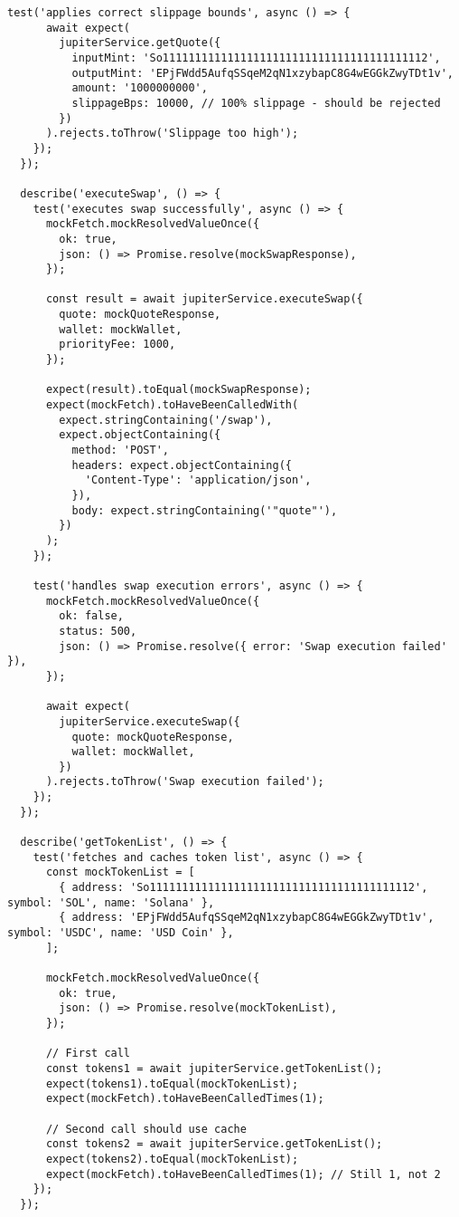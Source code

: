 \documentclass[11pt,a4paper]{article}
\begin{document}
\begin{lstlisting}[style=typescript, caption=Service Layer Unit Tests]
    test('applies correct slippage bounds', async () => {
      await expect(
        jupiterService.getQuote({
          inputMint: 'So11111111111111111111111111111111111111112',
          outputMint: 'EPjFWdd5AufqSSqeM2qN1xzybapC8G4wEGGkZwyTDt1v',
          amount: '1000000000',
          slippageBps: 10000, // 100% slippage - should be rejected
        })
      ).rejects.toThrow('Slippage too high');
    });
  });

  describe('executeSwap', () => {
    test('executes swap successfully', async () => {
      mockFetch.mockResolvedValueOnce({
        ok: true,
        json: () => Promise.resolve(mockSwapResponse),
      });

      const result = await jupiterService.executeSwap({
        quote: mockQuoteResponse,
        wallet: mockWallet,
        priorityFee: 1000,
      });

      expect(result).toEqual(mockSwapResponse);
      expect(mockFetch).toHaveBeenCalledWith(
        expect.stringContaining('/swap'),
        expect.objectContaining({
          method: 'POST',
          headers: expect.objectContaining({
            'Content-Type': 'application/json',
          }),
          body: expect.stringContaining('"quote"'),
        })
      );
    });

    test('handles swap execution errors', async () => {
      mockFetch.mockResolvedValueOnce({
        ok: false,
        status: 500,
        json: () => Promise.resolve({ error: 'Swap execution failed' }),
      });

      await expect(
        jupiterService.executeSwap({
          quote: mockQuoteResponse,
          wallet: mockWallet,
        })
      ).rejects.toThrow('Swap execution failed');
    });
  });

  describe('getTokenList', () => {
    test('fetches and caches token list', async () => {
      const mockTokenList = [
        { address: 'So11111111111111111111111111111111111111112', symbol: 'SOL', name: 'Solana' },
        { address: 'EPjFWdd5AufqSSqeM2qN1xzybapC8G4wEGGkZwyTDt1v', symbol: 'USDC', name: 'USD Coin' },
      ];

      mockFetch.mockResolvedValueOnce({
        ok: true,
        json: () => Promise.resolve(mockTokenList),
      });

      // First call
      const tokens1 = await jupiterService.getTokenList();
      expect(tokens1).toEqual(mockTokenList);
      expect(mockFetch).toHaveBeenCalledTimes(1);

      // Second call should use cache
      const tokens2 = await jupiterService.getTokenList();
      expect(tokens2).toEqual(mockTokenList);
      expect(mockFetch).toHaveBeenCalledTimes(1); // Still 1, not 2
    });
  });


\end{lstlisting}
\end{document}
